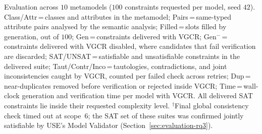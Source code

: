 \begin{table}[t]
\caption{Evaluation across $10$ metamodels ($100$ constraints requested per model, seed $42$). Class/Attr\,=\,classes and attributes in the metamodel; Pairs\,=\,same-typed attribute pairs analysed by the semantic analysis; Filled\,=\,slots filled by generation, out of $100$; Gen\,=\,constraints delivered with VGCR; Gen$^{-}$\,=\,constraints delivered with VGCR disabled, where candidates that fail verification are discarded; SAT/UNSAT\,=\,satisfiable and unsatisfiable constraints in the delivered suite; Taut/Contr/Inco\,=\,tautologies, contradictions, and joint inconsistencies caught by VGCR, counted per failed check across retries; Dup\,=\,near-duplicates removed before verification or rejected inside VGCR; Time\,=\,wall-clock generation and verification time per model with VGCR. All delivered SAT constraints lie inside their requested complexity level. $^{\dagger}$Final global consistency check timed out at scope~6; the SAT set of these suites was confirmed jointly satisfiable by USE's Model Validator (Section~\ref{sec:evaluation-rq3}).}
\label{tab:models}
\end{table}
